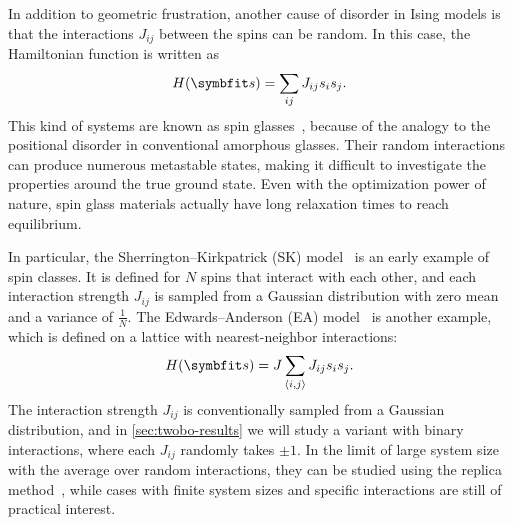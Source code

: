 In addition to geometric frustration, another cause of disorder in Ising models is that the interactions $J_{i j}$ between the spins can be random. In this case, the Hamiltonian function is written as
\begin{equation}
H(\vs) = \sum_{i j} J_{i j} s_i s_j.
\label{eq:cl-ising-general}
\end{equation}
This kind of systems are known as spin glasses~\cite{fischer1993spin, nishimori2001statistical}, because of the analogy to the positional disorder in conventional amorphous glasses. Their random interactions can produce numerous metastable states, making it difficult to investigate the properties around the true ground state. Even with the optimization power of nature, spin glass materials actually have long relaxation times to reach equilibrium.

In particular, the Sherrington--Kirkpatrick (SK) model~\cite{sherrington1975solvable} is an early example of spin classes. It is defined for $N$ spins that interact with each other, and each interaction strength $J_{i j}$ is sampled from a Gaussian distribution with zero mean and a variance of $\frac{1}{N}$. The Edwards--Anderson (EA) model~\cite{edwards1975theory} is another example, which is defined on a lattice with nearest-neighbor interactions:
\begin{equation}
H(\vs) = J \sum_{\langle i, j \rangle} J_{i j} s_i s_j.
\end{equation}
The interaction strength $J_{i j}$ is conventionally sampled from a Gaussian distribution, and in \cref{sec:twobo-results} we will study a variant with binary interactions, where each $J_{i j}$ randomly takes $\pm 1$. In the limit of large system size with the average over random interactions, they can be studied using the replica method~\cite{parisi1979infinite}, while cases with finite system sizes and specific interactions are still of practical interest.

